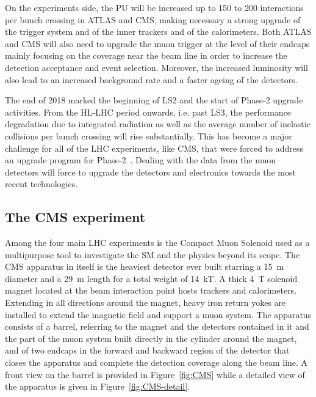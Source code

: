 	On the experiments side, the \acf{PU} will be increased up to 150 to 200 interactions per bunch crossing in ATLAS and CMS, making necessary a strong upgrade of the trigger system and of the inner trackers and of the calorimeters. Both ATLAS and CMS will also need to upgrade the muon trigger at the level of their endcaps mainly focusing on the coverage near the beam line in order to increase the detection acceptance and event selection. Moreover, the increased luminosity will also lead to an increased background rate and a faster ageing of the detectors.

	The end of 2018 marked the beginning of LS2 and the start of Phase-2 upgrade activities. From the HL-LHC period onwards, i.e. past LS3, the performance degradation due to integrated radiation as well as the average number of inelastic collisions per bunch crossing will rise substantially. This has become a major challenge for all of the LHC experiments, like CMS, that were forced to address an upgrade program for Phase-2~\cite{PHASEIITP}. Dealing with the data from the muon detectors will force to upgrade the detectors and electronics towards the most recent technologies.

	\subsection{The \acl{CMS} experiment}
	\label{chapt2:ssec:CMS}
	
	Among the four main LHC experiments is the Compact Muon Solenoid used as a multipurpose tool to investigate the SM and the physics beyond its scope. The CMS apparatus in itself is the heaviest detector ever built starring a \SI{15}{m} diameter and a \SI{29}{m} length for a total weight of \SI{14}{kT}. A thick \SI{4}{T} solenoid magnet located at the beam interaction point hosts trackers and calorimeters. Extending in all directions around the magnet, heavy iron return yokes are installed to extend the magnetic field and support a muon system. The apparatus consists of a barrel, referring to the magnet and the detectors contained in it and the part of the muon system built directly in the cylinder around the magnet, and of two endcaps in the forward and backward region of the detector that closes the apparatus and complete the detection coverage along the beam line. A front view on the barrel is provided in Figure~\ref{fig:CMS} while a detailed view of the apparatus is given in Figure~\ref{fig:CMS-detail}.
	
\begingroup\setlength{\intextsep}{5pt}\setlength{\columnsep}{15pt}
	
